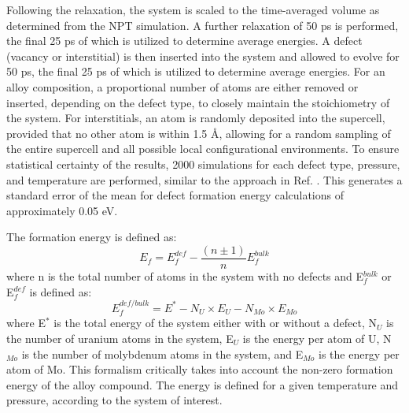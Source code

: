 \documentclass[default]{sn-jnl}%
\begin{document}
Following the relaxation, the system is scaled to the time-averaged volume as determined from the NPT simulation. A further relaxation of 50 ps is performed, the final 25 ps of which is utilized to determine average energies. A defect (vacancy or interstitial) is then inserted into the system and allowed to evolve for 50 ps, the final 25 ps of which is utilized to determine average energies. For an alloy composition, a proportional number of atoms are either removed or inserted, depending on the defect type, to closely maintain the stoichiometry of the system. For interstitials, an atom is randomly deposited into the supercell, provided that no other atom is within 1.5 \AA, allowing for a random sampling of the entire supercell and all possible local configurational environments. To ensure statistical certainty of the results, 2000 simulations for each defect type, pressure, and temperature are performed, similar to the approach in Ref. \cite{zhang2021}. This generates a standard error of the mean for defect formation energy calculations of approximately 0.05 eV. 

The formation energy is defined as:
\begin{equation}
 E_f= E_f^{def} -  \frac{(n\pm1)}{n}E_f^{bulk}
\end{equation}
\noindent where n is the total number of atoms in the system with no defects and E$_f^{bulk}$ or E$_f^{def}$ is defined as:
\begin{equation}
E_f^{def/bulk}= E^*- N_U \times E_U - N_{Mo} \times E_{Mo} 
\end{equation}
\noindent where E$^*$ is the total energy of the system either with or without a defect, N$_U$ is the number of uranium atoms in the system, E$_U$ is the energy per atom of U, N$_{Mo}$ is the number of molybdenum atoms in the system, and E$_{Mo}$ is the energy per atom of Mo. This formalism critically takes into account the non-zero formation energy of the alloy compound. The energy is defined for a given temperature and pressure, according to the system of interest. 
\end{document}
